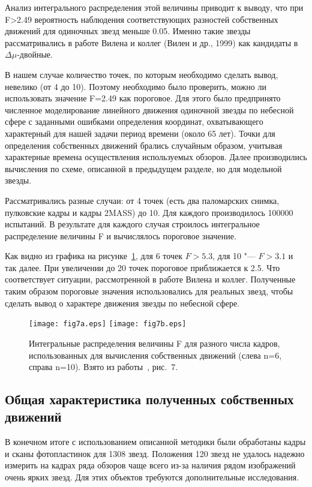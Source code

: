 Анализ интегрального распределения этой величины приводит к выводу, что при F>2.49 вероятность наблюдения соответствующих разностей собственных движений для одиночных звезд меньше 0.05. Именно такие звезды рассматривались в работе Вилена и коллег (Вилен и др., 1999) как кандидаты в $\Delta\mu$-двойные.

В нашем случае количество точек, по которым необходимо сделать вывод, невелико (от 4 до 10). Поэтому необходимо было проверить, можно ли использовать значение F=2.49 как пороговое. Для этого было предпринято численное моделирование линейного движения одиночной звезды по небесной сфере с заданными ошибками определения координат, охватывающего характерный для нашей задачи период времени (около 65 лет). Точки для определения собственных движений брались случайным образом, учитывая характерные времена осуществления используемых обзоров. Далее производились вычисления по схеме, описанной в предыдущем разделе, но для модельной звезды.

Рассматривались разные случаи: от 4 точек (есть два паломарских снимка, пулковские кадры и кадры 2MASS) до 10. Для каждого производилось 100000 испытаний. В результате для каждого случая строилось интегральное распределение величины F и вычислялось пороговое значение.

Как видно из графика на рисунке~\ref{fig:15Fint}, для 6 точек $F>5.3$, для 10 "--- $F>3.1$ и так далее. При увеличении до 20 точек пороговое приближается к 2.5. Что соответствует ситуации, рассмотренной в работе Вилена и коллег. Полученные таким образом пороговые значения использовались для реальных звезд, чтобы сделать вывод о характере движения звезды по небесной сфере.

\begin{figure}[h]
\centering
\texttt{[image: fig7a.eps]}
\texttt{[image: fig7b.eps]}
\caption{Интегральные распределения величины F для разного числа кадров, использованных для вычисления собственных движений (слева n=6, справа n=10). Взято из работы~\cite{2015AstL...41..833K}, рис.~7.}
\label{fig:15Fint}
\end{figure}
\subsection{Общая характеристика полученных собственных движений} \label{subsec:ch3/sect3/sub2}
В конечном итоге с использованием описанной методики были обработаны кадры и сканы фотопластинок для 1308 звезд. Положения 120 звезд не удалось надежно измерить на кадрах ряда обзоров чаще всего из-за наличия рядом изображений очень ярких звезд. Для этих объектов требуются дополнительные исследования.

